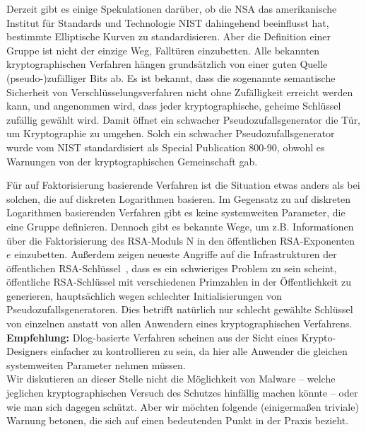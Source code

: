 \begin{refsegment}
Derzeit gibt es einige Spekulationen darüber, ob die NSA das amerikanische Institut für Standards und Technologie NIST dahingehend beeinflusst hat, bestimmte Elliptische Kurven zu standardisieren. Aber die Definition einer Gruppe ist nicht der einzige Weg, Falltüren einzubetten. Alle bekannten kryptographischen Verfahren hängen grundsätzlich von einer guten Quelle (pseudo-)zu\-fälliger Bits ab. Es ist bekannt, dass die sogenannte semantische Sicherheit von Verschlüsselungsverfahren nicht ohne Zufälligkeit erreicht werden kann, und angenommen wird, dass jeder kryptographische, geheime Schlüssel zufällig gewählt wird. Damit öffnet ein schwacher Pseudozufallsgenerator die Tür, um Kryptographie zu umgehen. Solch ein schwacher Pseudozufallsgenerator wurde vom NIST standardisiert als Special Publication 800-90, obwohl es Warnungen von der kryptographischen Gemeinschaft gab.

Für auf Faktorisierung basierende Verfahren ist die Situation etwas anders als bei solchen, die auf diskreten Logarithmen basieren. Im Gegensatz zu auf diskreten Logarithmen basierenden Verfahren gibt es keine systemweiten Parameter, die eine Gruppe definieren. Dennoch gibt es bekannte Wege, um z.B. Informationen über die Faktorisierung des RSA-Moduls N in den öffentlichen RSA-Exponenten $e$ einzubetten. Außerdem zeigen neueste Angriffe auf die Infrastrukturen der öffentlichen RSA-Schlüssel~\cite{keys2012, Heninger2012}, dass es ein schwieriges Problem zu sein scheint, öffentliche RSA-Schlüssel mit verschiedenen Primzahlen in der Öffentlichkeit zu generieren, hauptsächlich wegen schlechter Initialisierungen von Pseudozufallsgeneratoren. Dies betrifft natürlich nur schlecht gewählte Schlüssel von einzelnen anstatt von allen Anwendern eines kryptographischen Verfahrens.\\[0.1cm]




 \textbf{Empfehlung:} Dlog-basierte Verfahren scheinen aus der Sicht eines Krypto-Designers einfacher zu kontrollieren zu sein, da hier alle Anwender die gleichen systemweiten Parameter nehmen müssen.\\[0.1cm]


Wir diskutieren an dieser Stelle nicht die Möglichkeit von Malware -- welche jeglichen kryptographischen Versuch des Schutzes hinfällig machen könnte -- oder wie man sich dagegen schützt. Aber wir möchten folgende (einigermaßen triviale) Warnung betonen, die sich auf einen bedeutenden Punkt in der Praxis bezieht.\\[0.1cm]


\end{refsegment}
